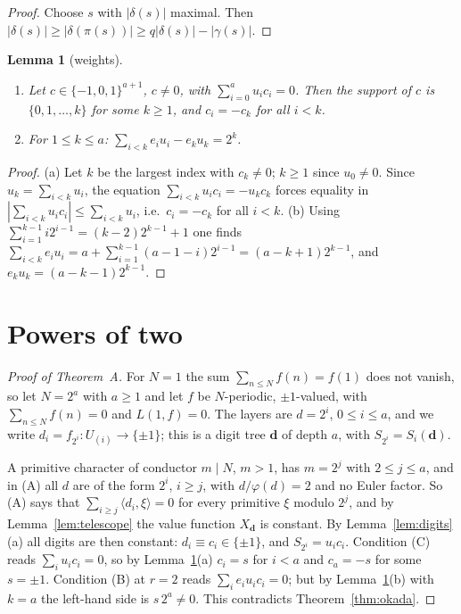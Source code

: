 \documentclass[11pt,a4paper]{article}
\newtheorem{lemma}[theorem]{Lemma}
\theoremstyle{definition}
\theoremstyle{remark}
\newcommand{\ip}[2]{\langle #1,#2\rangle}
\newcommand{\Uu}[1]{U_{(#1)}}
\begin{document}
\begin{proof}
Choose $s$ with $|\delta(s)|$ maximal. Then $|\delta(s)|\ge|\delta(\pi(s))|\ge q|\delta(s)|-|\gamma(s)|$.
\end{proof}

\begin{lemma}[weights]\label{lem:weights}
\begin{enumerate}[label=\textup{(\alph*)}]
\item Let $c\in\{-1,0,1\}^{a+1}$, $c\neq0$, with $\sum_{i=0}^au_ic_i=0$. Then the support of $c$ is $\{0,1,\dots,k\}$ for some $k\ge1$, and $c_i=-c_k$ for all $i<k$.
\item For $1\le k\le a$: $\sum_{i<k}e_iu_i-e_ku_k=2^k$.
\end{enumerate}
\end{lemma}

\begin{proof}
(a) Let $k$ be the largest index with $c_k\neq0$; $k\ge1$ since $u_0\ne0$. Since $u_k=\sum_{i<k}u_i$, the equation $\sum_{i<k}u_ic_i=-u_kc_k$ forces equality in $|\sum_{i<k}u_ic_i|\le\sum_{i<k}u_i$, i.e.\ $c_i=-c_k$ for all $i<k$. (b) Using $\sum_{i=1}^{k-1}i2^{i-1}=(k-2)2^{k-1}+1$ one finds $\sum_{i<k}e_iu_i=a+\sum_{i=1}^{k-1}(a-1-i)2^{i-1}=(a-k+1)2^{k-1}$, and $e_ku_k=(a-k-1)2^{k-1}$.
\end{proof}

\section{Powers of two}\label{sec:powers}

\begin{proof}[Proof of Theorem~A]
For $N=1$ the sum $\sum_{n\le N}f(n)=f(1)$ does not vanish, so let $N=2^a$ with $a\ge1$ and let $f$ be $N$-periodic, $\pm1$-valued, with $\sum_{n\le N}f(n)=0$ and $L(1,f)=0$. The layers are $d=2^i$, $0\le i\le a$, and we write $d_i=f_{2^i}\colon\Uu i\to\{\pm1\}$; this is a digit tree $\mathbf d$ of depth $a$, with $S_{2^i}=S_i(\mathbf d)$.

A primitive character of conductor $m\mid N$, $m>1$, has $m=2^j$ with $2\le j\le a$, and in (A) all $d$ are of the form $2^i$, $i\ge j$, with $d/\varphi(d)=2$ and no Euler factor. So (A) says that $\sum_{i\ge j}\ip{d_i}{\xi}=0$ for every primitive $\xi$ modulo $2^j$, and by Lemma~\ref{lem:telescope} the value function $X_{\mathbf d}$ is constant. By Lemma~\ref{lem:digits}(a) all digits are then constant: $d_i\equiv c_i\in\{\pm1\}$, and $S_{2^i}=u_ic_i$. Condition (C) reads $\sum_iu_ic_i=0$, so by Lemma~\ref{lem:weights}(a) $c_i=s$ for $i<a$ and $c_a=-s$ for some $s=\pm1$. Condition (B) at $r=2$ reads $\sum_ie_iu_ic_i=0$; but by Lemma~\ref{lem:weights}(b) with $k=a$ the left-hand side is $s\,2^a\neq0$. This contradicts Theorem~\ref{thm:okada}.
\end{proof}
\end{document}
